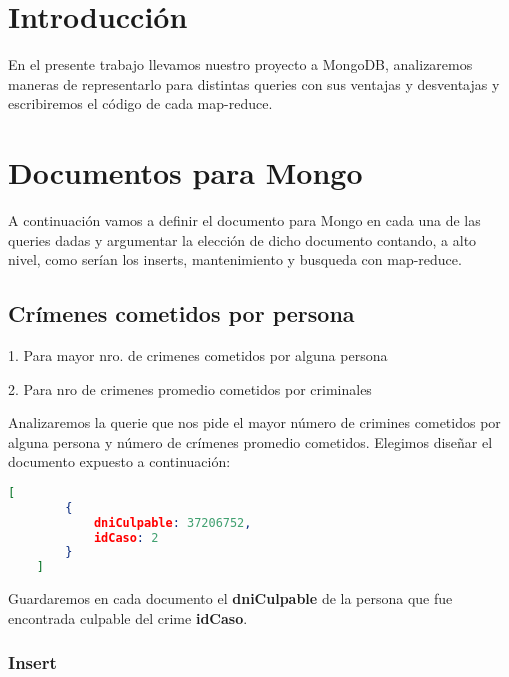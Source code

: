 \documentclass[11pt, a4paper]{article}
\begin{document}

\maketitle
\newpage

\tableofcontents
\newpage

%
\section{Introducción}

En el presente trabajo llevamos nuestro proyecto a MongoDB, analizaremos maneras de representarlo para distintas queries con sus ventajas y desventajas y escribiremos el c\'odigo de cada map-reduce.

\section{Documentos para Mongo}

A continuaci\'on vamos a definir el documento para Mongo en cada una de las queries dadas y argumentar la elecci\'on de dicho documento contando, a alto nivel, como ser\'ian los inserts, mantenimiento y busqueda con map-reduce.

\subsection{Cr\'imenes cometidos por persona}
1. Para mayor nro. de crimenes cometidos por alguna persona \

2. Para nro de crimenes promedio cometidos por criminales \

Analizaremos la querie que nos pide el mayor n\'umero de crimines cometidos por alguna persona y n\'umero de cr\'imenes promedio cometidos. Elegimos diseñar el documento expuesto a continuación: 

\begin{lstlisting}[language=json]
	[
		{
			dniCulpable: 37206752,
			idCaso: 2
		}
	]
\end{lstlisting}

Guardaremos en cada documento el \textbf{dniCulpable} de la persona que fue encontrada culpable del crime \textbf{idCaso}. \

\subsubsection{Insert}
\end{document}
